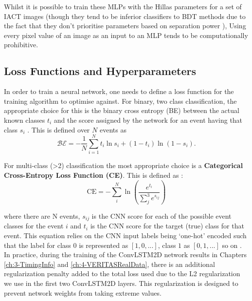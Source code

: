 Whilst it is possible to train these MLPs with the Hillas parameters for a set of IACT images (though they tend to be inferior classifiers to BDT methods due to the fact that they don't prioritise parameters based on separation power \cite{hessbdt}), 
Using every pixel value of an image as an input to an MLP tends to be computationally prohibitive.

\subsection{Loss Functions and Hyperparameters}
\label{MLdefs}
In order to train a neural network, one needs to define a loss function for the training algorithm to optimise against. For binary, two class classification, the appropriate choice for this is the  binary cross entropy (BE) between the actual known classes $t_i$ and the score assigned by the network for an event having that class $s_i$ \cite{Keras}. This is defined over $N$ events as
\begin{equation}
    \mathcal{BE}=-\frac{1}{N}\sum_{i=1}^{N}t_i\ln{s_i}+(1-t_i)\ln{(1-s_i)}.
\end{equation}

For multi-class (>2) classification the most appropriate choice is a \textbf{Categorical Cross-Entropy Loss Function (CE)}. This is defined \cite{Keras} as :
\begin{equation}
    \textrm{CE}=-\sum_i^N \ln \left( \frac{e^{t_{i}}}{\sum_j^3 e^{s_{ij}}} \right)
\end{equation}

where there are N events, $s_{ij}$  is the CNN score for each of the possible event classes for the event $i$ and $t_{i}$ is the CNN score for the target (true) class for that event. This equation relies on the CNN input labels being `one-hot' encoded such that the label for class $0$ is represented as $[1,0,...]$, class $1$ as $[0,1,...]$ so on \cite{fb}. In practice, during the training of the ConvLSTM2D network results in Chapters \ref{ch:3-TimingInfo} and \ref{ch:4-VERITASRealData}, there is an additional regularization penalty added to the total loss used due to the L2 regularization we use in the first two ConvLSTM2D layers. This regularization is designed to prevent network weights from taking extreme values.

